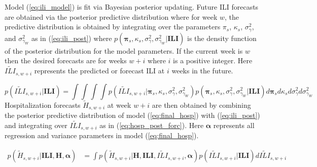 Model (\ref{eq:ili_model}) is fit via Bayesian posterior updating. Future ILI 
forecasts are obtained via the posterior predictive distribution where for
week $w$, the predictive distribution is obtained by integrating over the 
parameters $\pi_s$, $\kappa_s$, $\sigma^2_{\gamma}$, and $\sigma^2_{\gamma_W}$ 
as in (\ref{eq:ili_post}) where 
$p(\boldsymbol{\pi}_s, \kappa_s, \sigma^2_{\gamma}, \sigma^2_{\gamma_W} | \textbf{ILI})$ 
is the density function of the posterior distribution for the model parameters. 
If the current week is $w$ then the desired forecasts are for weeks $w + i$ 
where $i$ is a positive integer. Here $\widetilde{ILI}_{s,w + i}$ represents the 
predicted or forecast ILI at $i$ weeks in the future.

\begin{equation}
    \label{eq:ili_post}
    p(\widetilde{ILI}_{s,w +i} | \textbf{ILI}) = \int \int \int \int 
    p(\widetilde{ILI}_{s,w + i} | \boldsymbol{\pi}_s, \kappa_s, 
    \sigma^2_{\gamma}, \sigma^2_{\gamma_W}) p(\boldsymbol{\pi}_s, \kappa_s, 
    \sigma^2_{\gamma}, \sigma^2_{\gamma_W} | \textbf{ILI}) 
    d\boldsymbol{\pi}_s d \kappa_s d \sigma^2_{\gamma} d \sigma^2_{\gamma_W}
\end{equation}
Hospitalization forecasts $\widetilde{H}_{s,w + i}$ at week $w + i$ are then
obtained by combining the posterior predictive distribution of model 
(\ref{eq:final_hosp}) with (\ref{eq:ili_post}) and integrating over 
$\widetilde{ILI}_{s,w + i}$ as in (\ref{eq:hosp_post_forc}). Here 
$\boldsymbol{\alpha}$ represents all regression and variance parameters in
model (\ref{eq:final_hosp}).

\begin{equation}
\begin{aligned}
\label{eq:hosp_post_forc}
    p(\tilde{H}_{s,w + i} | \textbf{ILI}, \textbf{H}, \boldsymbol{\alpha}) &= 
       \int p(\tilde{H}_{s,w + i} | \textbf{H}, \textbf{ILI}, 
       \widetilde{ILI}_{s,w + i}, \boldsymbol{\alpha}) 
       p(\widetilde{ILI}_{s,w + i} | \textbf{ILI}) d\widetilde{ILI}_{s,w + i}
\end{aligned}
\end{equation}





 
   












